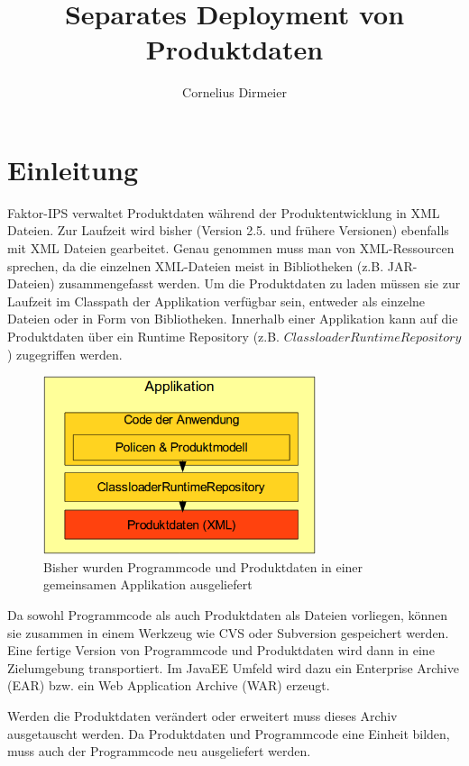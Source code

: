 \documentclass[headsepline=true, footsepline=true]{scrartcl}
\title{Separates Deployment von Produktdaten}
\author{Cornelius Dirmeier}
\begin{document}
\maketitle

\section{Einleitung}

Faktor-IPS verwaltet Produktdaten während der Produktentwicklung in XML Dateien.
Zur Laufzeit wird bisher (Version 2.5. und frühere Versionen) ebenfalls mit XML
Dateien gearbeitet. Genau genommen muss man von XML-Ressourcen sprechen, da die
einzelnen XML-Dateien meist in Bibliotheken (z.B. JAR-Dateien) zusammengefasst
werden. Um die Produktdaten zu laden müssen sie zur Laufzeit im Classpath der
Applikation verfügbar sein, entweder als einzelne Dateien oder in Form von
Bibliotheken. Innerhalb einer Applikation kann auf die Produktdaten über ein
Runtime Repository (z.B. $ClassloaderRuntimeRepository$) zugegriffen werden.

\begin{figure}[htb] \centering
\includegraphics[width=8cm]{./pics/old_architecture.png}
\caption{Bisher wurden Programmcode und Produktdaten in einer gemeinsamen
Applikation ausgeliefert}
\label{old_architecture}
\end{figure}

Da sowohl Programmcode als auch Produktdaten als Dateien vorliegen, können sie
zusammen in einem Werkzeug wie CVS oder Subversion gespeichert werden. Eine
fertige Version von Programmcode und Produktdaten wird dann in eine Zielumgebung
transportiert. Im JavaEE Umfeld wird dazu ein Enterprise Archive (EAR) bzw. ein
Web Application Archive (WAR) erzeugt.

Werden die Produktdaten verändert oder erweitert muss dieses Archiv ausgetauscht
werden. Da Produktdaten und Programmcode eine Einheit bilden, muss auch der
Programmcode neu ausgeliefert werden.
\end{document}
